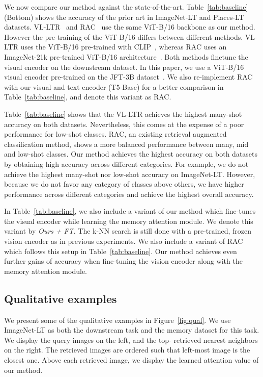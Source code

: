 We now compare our method against the state-of-the-art.
Table~\ref{tab:baseline} (Bottom) shows the accuracy of the prior art in ImageNet-LT and Places-LT datasets.
VL-LTR~\cite{tian2022vl} and RAC~\cite{long2022retrieval} use the same ViT-B/16 backbone as our method.
However the pre-training of the ViT-B/16 differs between different methods.
VL-LTR uses the ViT-B/16 pre-trained with CLIP~\cite{radford2021clip}, whereas RAC uses an ImageNet-21k pre-trained ViT-B/16 architecture~\cite{dosovitskiy2020image}.
Both methods finetune the visual encoder on the downstream dataset.
In this paper, we use a ViT-B/16 visual encoder pre-trained on the JFT-3B dataset~\cite{DBLP:conf/cvpr/Zhai0HB22}.
We also re-implement RAC with our visual and text encoder (T5-Base) for a better comparison in Table~\ref{tab:baseline}, and denote this variant as RAC.


Table~\ref{tab:baseline} shows that the VL-LTR achieves the highest many-shot accuracy on both datasets.
Nevertheless, this comes at the expense of a poor performance for low-shot classes.
RAC, an existing retrieval augmented classification method, shows a more balanced performance between many, mid and low-shot classes.
Our method achieves the highest accuracy on both datasets by obtaining high accuracy across different categories. 
For example, we do not achieve the highest many-shot nor low-shot accuracy on ImageNet-LT.
However, because we do not favor any category of classes above others, we have higher performance across different categories and achieve the highest overall accuracy.

In Table~\ref{tab:baseline}, we also include a variant of our method which fine-tunes the visual encoder  while learning the memory attention module.
We denote this variant by \emph{Ours + FT}.
The k-NN search is still done with a pre-trained, frozen vision encoder as in previous experiments.
We also include a variant of RAC which follows this setup in Table~\ref{tab:baseline}.
Our method achieves even further gains of accuracy when fine-tuning the vision encoder along with the memory attention module.


\subsection{Qualitative examples}

We present some of the qualitative examples in Figure~\ref{fig:qual}.
We use ImageNet-LT as both the downstream task and the memory dataset for this task.
We display the query images on the left, and the top- retrieved nearest neighbors on the right.
The retrieved images are ordered such that left-most image is the closest one.
Above each retrieved image, we display the learned attention value of our method. 


